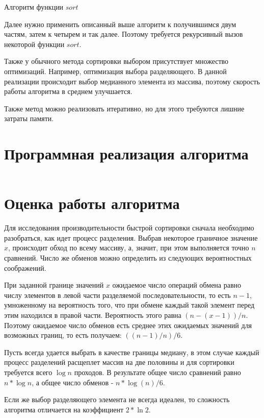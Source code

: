 \documentclass[bachelor, och, labwork]{shiza}
\begin{document}
\begin{center}Алгоритм функции $sort$\end{center}

Далее нужно применить описанный выше алгоритм к получившимся двум частям, затем 
к четырем и так далее. Поэтому требуется рекурсивный вызов некоторой функции 
$sort$.

Также у обычного метода сортировки выбором присутствует множество оптимизаций. 
Например, оптимизация выбора разделяющего. В данной реализации происходит выбор 
медианного элемента из массива, поэтому скорость работы алгоритма в среднем 
улучшается.

Также метод можно реализовать итеративно, но для этого требуются лишние затраты
памяти.


\section{Программная реализация алгоритма}

\inputminted[linenos,breaklines=true, fontsize=\small, style=bw]{python}{qs.py}

\section{Оценка работы алгоритма}

Для исследования производительности быстрой сортировки сначала необходимо
разобраться, как идет процесс разделения. Выбрав некоторое граничное значение
$x$, происходит обход по всему массиву, а, значит, при этом выполняется точно
$n$ сравнений. Число же обменов можно определить из следующих
вероятностных соображений.

При заданной границе значений $x$ ожидаемое число операций обмена равно числу 
элементов в левой части разделяемой последовательности, то есть $n-1$,
умноженному на вероятность того, что при обмене каждый такой элемент перед этим
находился в правой части. Вероятность этого равна $(n-(x-1))/n$. Поэтому 
ожидаемое число обменов есть среднее этих ожидаемых значений для возможных
границ, то есть получаем: $((n-1)/n)/6$.

Пусть всегда удается выбрать в качестве границы медиану, в этом случае каждый 
процесс разделений расщеплет массив на две половины и для сортировки требуется
всего $\log n$ проходов. В результате общее число сравнений равно $n*\log n$,
а общее число обменов - $n * \log (n)/6$.

Если же выбор разделяющего элемента не всегда идеален, то сложность алгоритма
отличается на коэффициент $2* \ln 2$.
\end{document}
